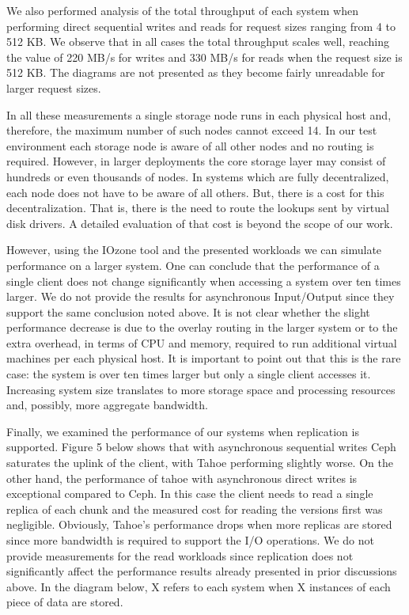 \documentclass[11pt]{article}
\begin{document}
We also performed analysis of the total throughput of each system 
when performing direct sequential writes and reads for request sizes 
ranging from 4 to 512 KB. We observe that in all cases the total 
throughput scales well, reaching the value of 220 MB/s for writes 
and 330 MB/s for reads when the request size is 512 KB. The diagrams 
are not presented as they become fairly unreadable for larger 
request sizes. 

In all these measurements a single storage node runs in each physical 
host and, therefore, the maximum number of such nodes cannot exceed 
14.  In our test environment each storage node is aware of all other 
nodes and no routing is required. However, in larger deployments the 
core storage layer may consist of hundreds or even thousands of nodes. 
In systems which are fully decentralized, each node does not have to 
be aware of all others. But, there is a cost for this decentralization. 
That is, there is the need to route the lookups sent by virtual disk 
drivers. A detailed evaluation of that cost is beyond the scope of our 
work.

However, using the IOzone tool and the presented workloads we can 
simulate performance on a larger system. One can conclude that the 
performance of a single client does not change significantly when 
accessing a system over ten times larger. We do not provide the results 
for asynchronous Input/Output since they support the same conclusion 
noted above. It is not clear whether the slight performance decrease 
is due to the overlay routing in the larger system or to the extra 
overhead, in terms of CPU and memory, required to run additional 
virtual machines per each physical host. It is important to point out 
that this is the rare case: the system is over ten times larger but 
only a single client accesses it. Increasing system size translates 
to more storage space and processing resources and, possibly, more 
aggregate bandwidth.


Finally, we examined the performance of our systems when replication is 
supported. Figure 5 below shows that with asynchronous sequential writes 
Ceph saturates the uplink of the client, with Tahoe performing slightly 
worse. On the other hand, the performance of tahoe with asynchronous 
direct writes is exceptional compared to Ceph.  In this case the client 
needs to read a single replica of each chunk and the measured cost for 
reading the versions first was negligible.  Obviously, Tahoe’s performance 
drops when more replicas are stored since more bandwidth is required to 
support the I/O operations. We do not provide measurements for the read 
workloads since replication does not significantly affect the performance 
results already presented in prior discussions above. In the diagram below, 
X refers to each system when X instances of each piece of data are stored.
\end{document}
